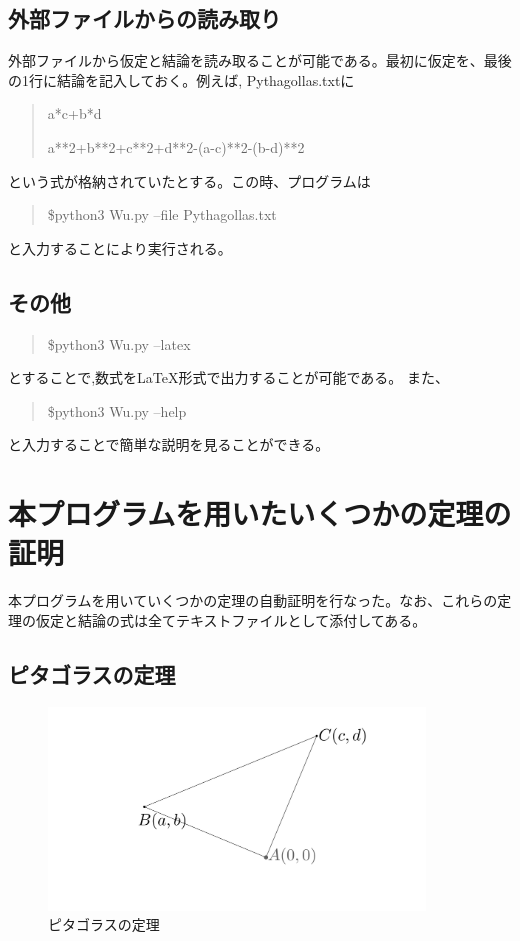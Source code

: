 \documentclass[dvipdfmx]{jsarticle}
\begin{document}
\subsection{外部ファイルからの読み取り}
外部ファイルから仮定と結論を読み取ることが可能である。最初に仮定を、最後の1行に結論を記入しておく。例えば, Pythagollas.txtに
\begin{quote}
a*c+b*d

a**2+b**2+c**2+d**2-(a-c)**2-(b-d)**2
\end{quote}
という式が格納されていたとする。この時、プログラムは
\begin{quote}
\$python3 Wu.py --file Pythagollas.txt 
\end{quote}
と入力することにより実行される。

\subsection{その他}
\begin{quote}

\$python3 Wu.py --latex
\end{quote}
とすることで,数式を{\LaTeX}形式で出力することが可能である。
また、
\begin{quote}
\$python3 Wu.py --help
\end{quote}
と入力することで簡単な説明を見ることができる。
\clearpage
\section{本プログラムを用いたいくつかの定理の証明}
本プログラムを用いていくつかの定理の自動証明を行なった。なお、これらの定理の仮定と結論の式は全てテキストファイルとして添付してある。
    \subsection{ピタゴラスの定理}
        \begin{figure}[H]
            \centering
            \includegraphics[width=10cm]{Pythagoras.png}
            \caption{ピタゴラスの定理}
            \label{fig:Pythagoras}      
        \end{figure}
\end{document}
